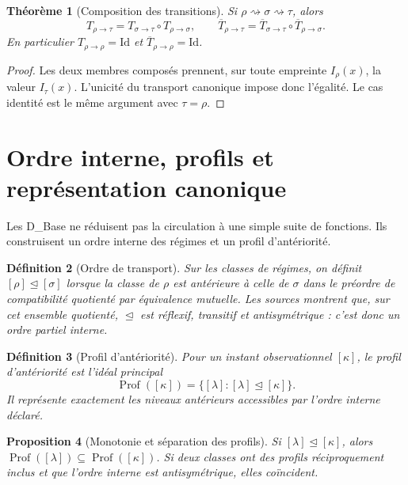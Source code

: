 \documentclass[11pt,a4paper,openany]{book}
\newtheorem{definition}{Définition}[chapter]
\newtheorem{proposition}[definition]{Proposition}
\newtheorem{theorem}[definition]{Théorème}
\begin{document}
\begin{theorem}[Composition des transitions]
Si \(\rho\rightsquigarrow\sigma\rightsquigarrow\tau\), alors
\[
T_{\rho\to\tau}=T_{\sigma\to\tau}\circ T_{\rho\to\sigma},
\qquad
\overline T_{\rho\to\tau}=\overline T_{\sigma\to\tau}\circ\overline T_{\rho\to\sigma}.
\]
En particulier \(T_{\rho\to\rho}=\mathrm{Id}\) et \(\overline T_{\rho\to\rho}=\mathrm{Id}\).
\end{theorem}

\begin{proof}
Les deux membres composés prennent, sur toute empreinte \(I_\rho(x)\), la valeur \(I_\tau(x)\). L'unicité du transport canonique impose donc l'égalité. Le cas identité est le même argument avec \(\tau=\rho\).
\end{proof}

\section{Ordre interne, profils et représentation canonique}

Les D\_Base ne réduisent pas la circulation à une simple suite de fonctions. Ils construisent un ordre interne des régimes et un profil d'antériorité.

\begin{definition}[Ordre de transport]
Sur les classes de régimes, on définit \([\rho]\trianglelefteq[\sigma]\) lorsque la classe de \(\rho\) est antérieure à celle de \(\sigma\) dans le préordre de compatibilité quotienté par équivalence mutuelle. Les sources montrent que, sur cet ensemble quotienté, \(\trianglelefteq\) est réflexif, transitif et antisymétrique : c'est donc un ordre partiel interne.
\end{definition}

\begin{definition}[Profil d'antériorité]
Pour un instant observationnel \([\kappa]\), le profil d'antériorité est l'idéal principal
\[
\operatorname{Prof}([\kappa])=\{[\lambda]:[\lambda]\trianglelefteq[\kappa]\}.
\]
Il représente exactement les niveaux antérieurs accessibles par l'ordre interne déclaré.
\end{definition}

\begin{proposition}[Monotonie et séparation des profils]
Si \([\lambda]\trianglelefteq[\kappa]\), alors \(\operatorname{Prof}([\lambda])\subseteq\operatorname{Prof}([\kappa])\). Si deux classes ont des profils réciproquement inclus et que l'ordre interne est antisymétrique, elles coïncident.
\end{proposition}
\end{document}
